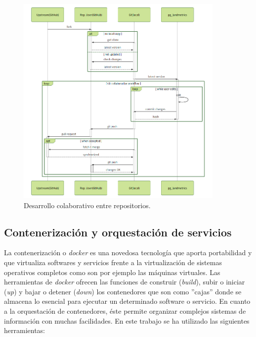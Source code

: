 \begin{figure}
\begin{center}
\includegraphics[width=0.9\textwidth]{Metodologia/Figs/pullrequest.png}
\caption{Desarrollo colaborativo entre repositorios. \label{fig:pullrequest}}
\end{center}
\end{figure}


\subsection{Contenerización y orquestación de servicios}\label{subsec:conten-orquest}

La contenerización o \textit{docker} es una novedosa tecnología que aporta portabilidad y que virtualiza softwares y servicios frente a la virtualización de sistemas operativos completos como son por ejemplo las máquinas virtuales. Las herramientas de \textit{docker} ofrecen las funciones de construir (\textit{build}), subir o iniciar (\textit{up}) y bajar o detener (\textit{down}) los contenedores que son como ''cajas'' donde se almacena lo esencial para ejecutar un determinado software o servicio. En cuanto a la orquestación de contenedores, éste permite organizar complejos sistemas de información con muchas facilidades. En este trabajo se ha utilizado las siguientes herramientas:

